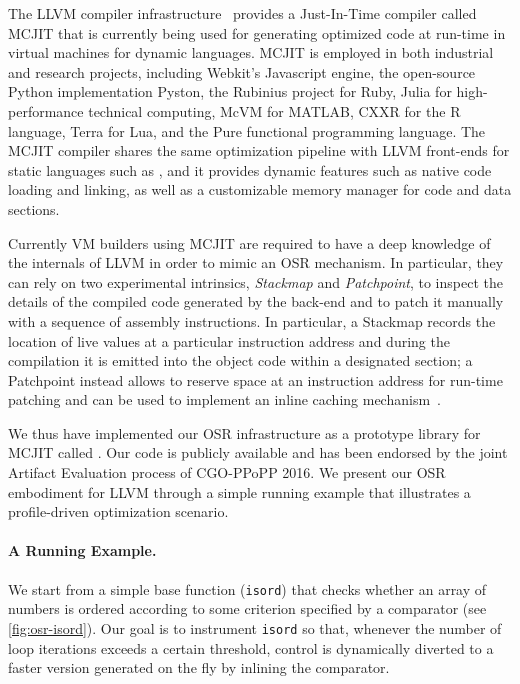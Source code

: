The LLVM compiler infrastructure~\cite{Lattner04} provides a Just-In-Time compiler called MCJIT that is currently being used for generating optimized code at run-time in virtual machines for dynamic languages. MCJIT is employed in both industrial and research projects, including Webkit's Javascript engine, the open-source Python implementation Pyston, the Rubinius project for Ruby, Julia for high-performance technical computing, McVM for MATLAB, CXXR for the R language, Terra for Lua, and the Pure functional programming language. The MCJIT compiler shares the same optimization pipeline with LLVM front-ends for static languages such as \clang, and it provides dynamic features such as native code loading and linking, as well as a customizable memory manager for code and data sections.

Currently VM builders using MCJIT are required to have a deep knowledge of the internals of LLVM in order to mimic an OSR mechanism. In particular, they can rely on two experimental intrinsics, {\em Stackmap} and {\em Patchpoint}, to inspect the details of the compiled code generated by the back-end and to patch it manually with a sequence of assembly instructions. In particular, a Stackmap records the location of live values at a particular instruction address and during the compilation it is emitted into the object code within a designated section; a Patchpoint instead allows to reserve space at an instruction address for run-time patching and can be used to implement an inline caching mechanism~\cite{Pizlo14, Deutsch84}.

We thus have implemented our OSR infrastructure as a prototype library for MCJIT called \osrkit. Our code is publicly available and has been endorsed by the joint Artifact Evaluation process of CGO-PPoPP 2016. We present our OSR embodiment for LLVM through a simple running example that illustrates a profile-driven optimization scenario.

\paragraph*{A Running Example.} We start from a simple base function ({\tt isord}) that checks whether an array of numbers is ordered according to some criterion specified by a comparator (see \myfigure\ref{fig:osr-isord}). Our goal is to instrument {\tt isord} so that, whenever the number of loop iterations exceeds a certain threshold, control is dynamically diverted to a faster version generated on the fly by inlining the comparator.

